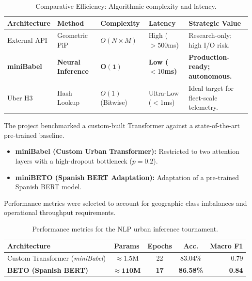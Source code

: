 \documentclass[10pt, letterpaper]{article}
\begin{document}
\begin{table}[H]
    \centering
    \small
    \begin{tabularx}{\textwidth}{l l l l X}
        \toprule
        \textbf{Architecture} & \textbf{Method} & \textbf{Complexity} & \textbf{Latency} & \textbf{Strategic Value} \\
        \midrule
        External API & Geometric PiP & $O(N \times M)$ & High ($>500$ms) & Research-only; high I/O risk. \\
        \addlinespace
        \textbf{miniBabel} & \textbf{Neural Inference} & $\mathbf{O(1)}$ & \textbf{Low ($<10$ms)} & \textbf{Production-ready; autonomous.} \\
        \addlinespace
        Uber H3 & Hash Lookup & $O(1)$ (Bitwise) & Ultra-Low ($<1$ms) & Ideal target for fleet-scale telemetry. \\
        \bottomrule
    \end{tabularx}
    \caption{Comparative Efficiency: Algorithmic complexity and latency.}
    \label{tab:babel_efficiency}
\end{table}

The project benchmarked a custom-built Transformer against a state-of-the-art pre-trained baseline.
\begin{itemize}[noitemsep, topsep=3pt]
    \item \textbf{miniBabel (Custom Urban Transformer):} Restricted to two attention layers with a high-dropout bottleneck ($p=0.2$). 
    \item \textbf{miniBETO (Spanish BERT Adaptation):} Adaptation of a pre-trained Spanish BERT model. 
\end{itemize}

Performance metrics were selected to account for geographic class imbalances and operational throughput requirements.

\begin{table}[H]
    \centering
    \small
    \begin{tabular}{l c c c r}
        \toprule
        \textbf{Architecture} & \textbf{Params} & \textbf{Epochs} & \textbf{Acc.} & \textbf{Macro F1} \\
        \midrule
        Custom Transformer (\textit{miniBabel}) & $\approx 1.5$M & 22 & 83.04\% & 0.79 \\
        \addlinespace
        \textbf{BETO (Spanish BERT)} & $\approx \mathbf{110}$\textbf{M} & \textbf{17} & \textbf{86.58\%} & \textbf{0.84} \\
        \bottomrule
    \end{tabular}
    \caption{Performance metrics for the NLP urban inference tournament.}
    \label{tab:nlp_benchmarks}
\end{table}
\end{document}
